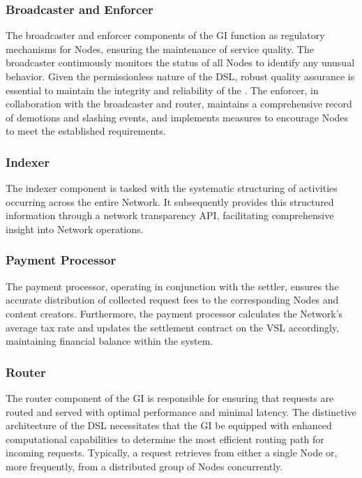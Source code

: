 \subsubsection{Broadcaster and Enforcer}
The broadcaster and enforcer components of the \gls{GI} function as regulatory mechanisms for \glspl{Node}, ensuring the maintenance of service quality. The broadcaster continuously monitors the status of all \glspl{Node} to identify any unusual behavior. Given the permissionless nature of the \gls{DSL}, robust quality assurance is essential to maintain the integrity and reliability of the .
The enforcer, in collaboration with the broadcaster and router, maintains a comprehensive record of demotions and slashing events, and implements measures to encourage \glspl{Node} to meet the established requirements.

\subsubsection{Indexer}
The indexer component is tasked with the systematic structuring of activities occurring across the entire Network. It subsequently provides this structured information through a network transparency API, facilitating comprehensive insight into Network operations.

\subsubsection{Payment Processor}
The payment processor, operating in conjunction with the settler, ensures the accurate distribution of collected request fees to the corresponding \glspl{Node} and content creators.
Furthermore, the payment processor calculates the Network's average tax rate and updates the settlement contract on the \gls{VSL} accordingly, maintaining financial balance within the system.

\subsubsection{Router}
The router component of the \gls{GI} is responsible for ensuring that requests are routed and served with optimal performance and minimal latency.
The distinctive architecture of the \gls{DSL} necessitates that the \gls{GI} be equipped with enhanced computational capabilities to determine the most efficient routing path for incoming requests. Typically, a request retrieves  from either a single \gls{Node} or, more frequently, from a distributed group of \glspl{Node} concurrently.

